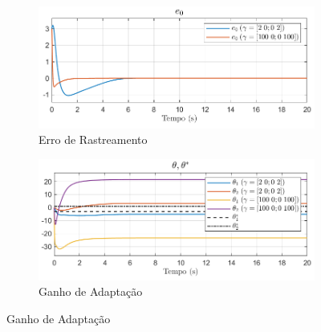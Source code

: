 \documentclass[10pt]{article}
\begin{document}
\begin{figure}[h!]
    \centering
    \begin{subfigure}[b]{0.3\textwidth}
        \centering
        \includegraphics[width=\textwidth]{img/fig03a.png}
        \caption{Erro de Rastreamento}
    \end{subfigure}
    \begin{subfigure}[b]{0.3\textwidth}
        \centering
        \includegraphics[width=\textwidth]{img/fig03b.png}
        \caption{Ganho de Adaptação}
    \end{subfigure}


\end{figure}
\end{document}
